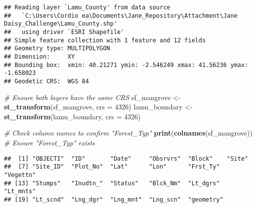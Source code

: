 \documentclass[
]{article}
\newenvironment{Shaded}{\begin{snugshade}}{\end{snugshade}}
\newcommand{\AttributeTok}[1]{\textcolor[rgb]{0.13,0.29,0.53}{#1}}
\newcommand{\CommentTok}[1]{\textcolor[rgb]{0.56,0.35,0.01}{\textit{#1}}}
\newcommand{\DecValTok}[1]{\textcolor[rgb]{0.00,0.00,0.81}{#1}}
\newcommand{\FunctionTok}[1]{\textcolor[rgb]{0.13,0.29,0.53}{\textbf{#1}}}
\newcommand{\NormalTok}[1]{#1}
\newcommand{\OtherTok}[1]{\textcolor[rgb]{0.56,0.35,0.01}{#1}}
\begin{document}
\begin{verbatim}
## Reading layer `Lamu_County' from data source 
##   `C:\Users\Cordio ea\Documents\Jane_Repository\Attachment\Jane Daisy_Challenge\Lamu_County.shp' 
##   using driver `ESRI Shapefile'
## Simple feature collection with 1 feature and 12 fields
## Geometry type: MULTIPOLYGON
## Dimension:     XY
## Bounding box:  xmin: 40.21271 ymin: -2.546249 xmax: 41.56236 ymax: -1.658023
## Geodetic CRS:  WGS 84
\end{verbatim}

\begin{Shaded}
\begin{Highlighting}[]
\CommentTok{\# Ensure both layers have the same CRS}
\NormalTok{sf\_mangrove }\OtherTok{\textless{}{-}} \FunctionTok{st\_transform}\NormalTok{(sf\_mangrove, }\AttributeTok{crs =} \DecValTok{4326}\NormalTok{)}
\NormalTok{lamu\_boundary }\OtherTok{\textless{}{-}} \FunctionTok{st\_transform}\NormalTok{(lamu\_boundary, }\AttributeTok{crs =} \DecValTok{4326}\NormalTok{)}

\CommentTok{\# Check column names to confirm "Forest\_Typ"}
\FunctionTok{print}\NormalTok{(}\FunctionTok{colnames}\NormalTok{(sf\_mangrove))  }\CommentTok{\# Ensure "Forest\_Typ" exists}
\end{Highlighting}
\end{Shaded}

\begin{verbatim}
##  [1] "OBJECTI"  "ID"       "Date"     "Obsrvrs"  "Block"    "Site"    
##  [7] "Site_ID"  "Plot_No"  "Lat"      "Lon"      "Frst_Ty"  "Vegettn" 
## [13] "Stumps"   "Inudtn_"  "Status"   "Blck_Nm"  "Lt_dgrs"  "Lt_mnts" 
## [19] "Lt_scnd"  "Lng_dgr"  "Lng_mnt"  "Lng_scn"  "geometry"
\end{verbatim}
\end{document}
